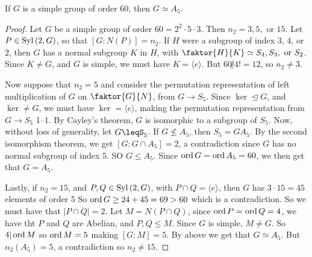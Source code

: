 \begin{theorem}\label{4.6.2}
    If $G$ is a simple group of order  $60$, then  $G \simeq A_5$.
\end{theorem}
\begin{proof}
    Let $G$ be a simple group of order  $60=2^2 \cdot 5 \cdot 3$. Then
    $n_2=3,5, \text{ or } 15$. Let $P \in \operatorname{Syl}{(2,G)}$, so that $[G:N(P)]=n_2$.
    If $H$ were a subgroup of index $3$, $4$, or $2$, then $G$ has a normal
    subgroup  $K$ in  $H$, with  $\faktor{H}{K} \simeq S_4, S_3, \text{ or
    }S_2$. Since $K \neq G$, and  $G$ is simple, we must have $K=\langle e
    \rangle$. But $60 \not| 4!=12$, so  $n_2 \neq 3$.

    Now suppose that $n_2=5$ and consider the permutation representation of left
    multiplication of $G$ on  $\faktor{G}{N}$, from $G \xrightarrow{} S_5$.
    Since $\ker \unlhd G$, and $\ker \neq G$, we must have $\ker=\langle e
    \rangle$, making the permutation representation from $G \xrightarrow{} S_5$
    1--1. By Cayley's theorem, $G$ is isomorphic to a subgroup of  $S_5$. Now,
    without loss of generality, let $G \leqS_5$. If $G \not\leq A_5$, then
    $S_5=GA_5$. By the second isomorphism theorem, we get $[G: G \cap A_5]=2$, a
    contradiction since $G$ has no normal subgroup of index  $5$. SO  $G \leq
    A_5$. Since $\operatorname{ord}{G}=\operatorname{ord}{A_5}=60$, we then get that $G=A_5$.

    Lastly, if $n_2=15$, and $P,Q \in \operatorname{Syl}{(2,G)}$, with $P \cap Q=\langle e
    \rangle$, then $G$ has  $3 \cdot 15=45$ elements of order $5$ So $\operatorname{ord}{G}
    \geq 24+45=69>60$ which is a contradiction. So we must have that $|P \cap
    Q|=2$. Let  $M=N(P \cap Q)$, since $\operatorname{ord}{P}=\operatorname{ord}{Q}=4$, we have tht $P$ and
     $Q$ are Abelian, and  $P,Q \leq M$. Since  $G$ is simple,  $M \neq G$. So
     $4|\operatorname{ord}{M}$ so $\operatorname{ord}{M}=5$ making $[G:M]=5$. By above we get that $G \simeq
     A_5$. But $n_2(A_5)=5$, a contradiction so $n_2 \neq 15$.
\end{proof}
